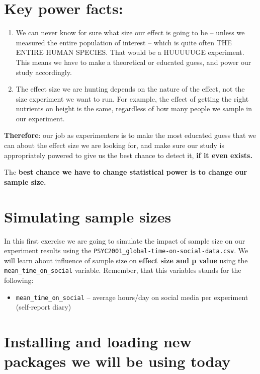 \documentclass[
]{book}
\providecommand{\tightlist}{%
  \setlength{\itemsep}{0pt}\setlength{\parskip}{0pt}}
\begin{document}
\section{Key power facts:}\label{key-power-facts}

\begin{enumerate}
\def\labelenumi{\arabic{enumi}.}
\item
  We can never know for sure what size our effect is going to be -- unless we measured the entire population of interest -- which is quite often THE ENTIRE HUMAN SPECIES. That would be a HUUUUUGE experiment. This means we have to make a theoretical or educated guess, and power our study accordingly.
\item
  The effect size we are hunting depends on the nature of the effect, not the size experiment we want to run. For example, the effect of getting the right nutrients on height is the same, regardless of how many people we sample in our experiment.
\end{enumerate}

\textbf{Therefore}: our job as experimenters is to make the most educated guess that we can about the effect size we are looking for, and make sure our study is appropriately powered to give us the best chance to detect it, \textbf{if it even exists.}

The \textbf{best chance we have to change statistical power is to change our sample size.}

\section{Simulating sample sizes}\label{simulating-sample-sizes}

In this first exercise we are going to simulate the impact of sample size on our experiment results using the \texttt{PSYC2001\_global-time-on-social-data.csv}. We will learn about influence of sample size on \textbf{effect size and p value} using the \texttt{mean\_time\_on\_social} variable. Remember, that this variables stands for the following:

\begin{itemize}
\tightlist
\item
  \texttt{mean\_time\_on\_social} -- average hours/day on social media per experiment (self-report diary)
\end{itemize}

\section{Installing and loading new packages we will be using today}\label{installing-and-loading-new-packages-we-will-be-using-today}
\end{document}
